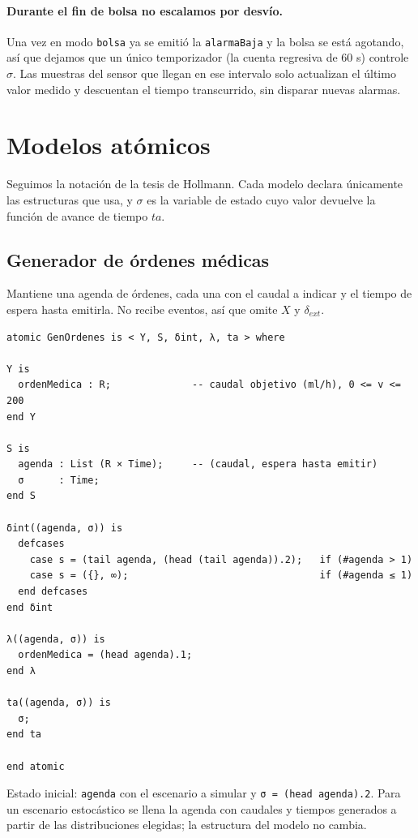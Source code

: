 \documentclass[11pt,a4paper]{article}
\begin{document}
\paragraph{Durante el fin de bolsa no escalamos por desvío.} Una vez en modo \texttt{bolsa} ya se emitió la \texttt{alarmaBaja} y la bolsa se está agotando, así que dejamos que un único temporizador (la cuenta regresiva de 60 s) controle $\sigma$. Las muestras del sensor que llegan en ese intervalo solo actualizan el último valor medido y descuentan el tiempo transcurrido, sin disparar nuevas alarmas.

\section{Modelos atómicos}

Seguimos la notación de la tesis de Hollmann. Cada modelo declara únicamente las estructuras que usa, y $\sigma$ es la variable de estado cuyo valor devuelve la función de avance de tiempo $ta$.

\subsection{Generador de órdenes médicas}

Mantiene una agenda de órdenes, cada una con el caudal a indicar y el tiempo de espera hasta emitirla. No recibe eventos, así que omite $X$ y $\delta_{ext}$.

\begin{lstlisting}[style=cml]
atomic GenOrdenes is < Y, S, δint, λ, ta > where

Y is
  ordenMedica : R;              -- caudal objetivo (ml/h), 0 <= v <= 200
end Y

S is
  agenda : List (R × Time);     -- (caudal, espera hasta emitir)
  σ      : Time;
end S

δint((agenda, σ)) is
  defcases
    case s = (tail agenda, (head (tail agenda)).2);   if (#agenda > 1)
    case s = ({}, ∞);                                 if (#agenda ≤ 1)
  end defcases
end δint

λ((agenda, σ)) is
  ordenMedica = (head agenda).1;
end λ

ta((agenda, σ)) is
  σ;
end ta

end atomic
\end{lstlisting}

\noindent Estado inicial: \texttt{agenda} con el escenario a simular y \texttt{σ = (head agenda).2}. Para un escenario estocástico se llena la agenda con caudales y tiempos generados a partir de las distribuciones elegidas; la estructura del modelo no cambia.
\end{document}
